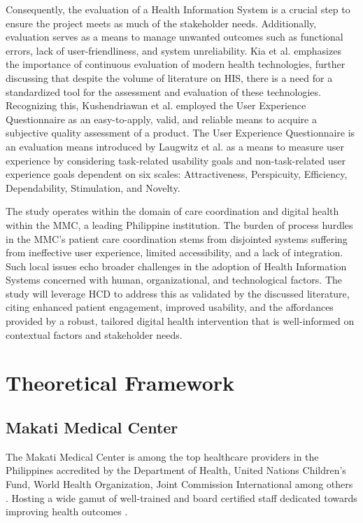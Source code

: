 \documentclass[11pt,a4paper,titlepage]{article}
\let\stdsection\section
\renewcommand\section{\newpage\stdsection}
\begin{document}
	Consequently, the evaluation of a Health Information System is a crucial step to ensure the project meets as much of the stakeholder needs. Additionally, evaluation serves as a means to manage unwanted outcomes such as functional errors, lack of user-friendliness, and system unreliability. Kia et al.\cite{sharifikia_2022_health} emphasizes the importance of continuous evaluation of modern health technologies, further discussing that despite the volume of literature on HIS, there is a need for a standardized tool for the assessment and evaluation of these technologies. Recognizing this, Kushendriawan et al.  \cite{aldikushendriawan_2021_evaluating} employed the User Experience Questionnaire as an easy-to-apply, valid, and reliable means to acquire a subjective quality assessment of a product. The User Experience Questionnaire is an evaluation means introduced by Laugwitz et al. \cite{laugwitz_2008_construction} as a means to measure user experience by considering task-related usability goals and non-task-related user experience goals dependent on six scales: Attractiveness, Perspicuity, Efficiency, Dependability, Stimulation, and Novelty.

	The study operates within the domain of care coordination and digital health within the MMC, a leading Philippine institution. The burden of process hurdles in the MMC's patient care coordination stems from disjointed systems suffering from ineffective user experience, limited accessibility, and a lack of integration. Such local issues echo broader  challenges in the adoption of Health Information Systems concerned with human, organizational, and technological factors. The study will leverage HCD to address this as validated by the discussed literature, citing enhanced patient engagement, improved usability, and the affordances provided by a robust, tailored digital health intervention that is well-informed on contextual factors and stakeholder needs. 

	
	
	\section{Theoretical Framework}
	
	\subsection{Makati Medical Center}
	The Makati Medical Center is among the top healthcare providers in the Philippines accredited by the Department of Health, United Nations Children's Fund, World Health Organization, Joint Commission International among others \cite{makatimedicalcenter_about, makatimedicalcenter_2025_makatimed}. Hosting a wide gamut of well-trained and board certified staff dedicated towards improving health outcomes \cite{kritikakritika_2025_top, metroguide_2021_the, flor_2023_top}. 
	
\end{document}
